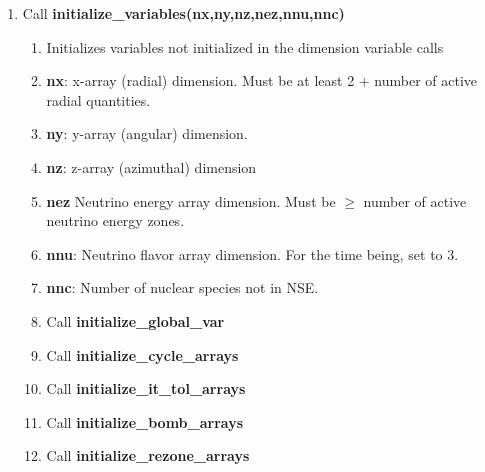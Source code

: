 \documentclass[11pt,doublespace]{article}
\begin{document}
\begin{itemize}
\begin{enumerate}
\begin{enumerate}
  \item Call {\bf initialize\_variables(nx,ny,nz,nez,nnu,nnc)}
\begin{enumerate}
  \item Initializes variables not initialized in the dimension variable calls
  \item {\bf nx}: x-array (radial) dimension. Must be at least 2 + number of active radial quantities.
  \item {\bf ny}: y-array (angular) dimension.
  \item {\bf nz}: z-array (azimuthal) dimension
  \item  {\bf nez} Neutrino energy array dimension. Must be $\ge$ number of active neutrino energy zones.
  \item  {\bf nnu}: Neutrino flavor array dimension. For the time being, set to 3.
  \item  {\bf nnc}: Number of nuclear species not in NSE.
  \item Call {\bf initialize\_global\_var}
  \item Call {\bf initialize\_cycle\_arrays}
  \item Call {\bf initialize\_it\_tol\_arrays}
  \item Call {\bf initialize\_bomb\_arrays}
  \item Call {\bf initialize\_rezone\_arrays}
\end{enumerate}


\end{enumerate}
\end{enumerate}
\end{itemize}
\end{document}
